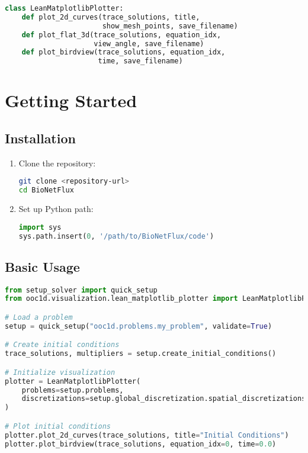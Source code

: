 \documentclass[11pt,a4paper]{article}
\begin{document}
\begin{lstlisting}[language=Python, caption={Visualization Methods}]
class LeanMatplotlibPlotter:
    def plot_2d_curves(trace_solutions, title, 
                       show_mesh_points, save_filename)
    def plot_flat_3d(trace_solutions, equation_idx, 
                     view_angle, save_filename)
    def plot_birdview(trace_solutions, equation_idx, 
                      time, save_filename)
\end{lstlisting}

\section{Getting Started}

\subsection{Installation}

\begin{enumerate}
    \item Clone the repository:
    \begin{lstlisting}[language=bash]
git clone <repository-url>
cd BioNetFlux
    \end{lstlisting}
    
    \item Set up Python path:
    \begin{lstlisting}[language=Python]
import sys
sys.path.insert(0, '/path/to/BioNetFlux/code')
    \end{lstlisting}
\end{enumerate}

\subsection{Basic Usage}

\begin{lstlisting}[language=Python, caption={Basic Usage Example}]
from setup_solver import quick_setup
from ooc1d.visualization.lean_matplotlib_plotter import LeanMatplotlibPlotter

# Load a problem
setup = quick_setup("ooc1d.problems.my_problem", validate=True)

# Create initial conditions
trace_solutions, multipliers = setup.create_initial_conditions()

# Initialize visualization
plotter = LeanMatplotlibPlotter(
    problems=setup.problems,
    discretizations=setup.global_discretization.spatial_discretizations
)

# Plot initial conditions
plotter.plot_2d_curves(trace_solutions, title="Initial Conditions")
plotter.plot_birdview(trace_solutions, equation_idx=0, time=0.0)
\end{lstlisting}
\end{document}

